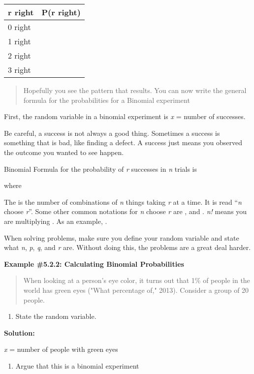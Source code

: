 \documentclass[]{book}
\providecommand{\tightlist}{%
  \setlength{\itemsep}{0pt}\setlength{\parskip}{0pt}}
\begin{document}
\begin{longtable}[]{@{}ll@{}}
\toprule
r right & P(r right)\tabularnewline
\midrule
\endhead
0 right &\tabularnewline
1 right &\tabularnewline
2 right &\tabularnewline
3 right &\tabularnewline
\bottomrule
\end{longtable}

\begin{quote}
Hopefully you see the pattern that results. You can now write the
general formula for the probabilities for a Binomial experiment
\end{quote}

First, the random variable in a binomial experiment is \emph{x} = number of
successes.

Be careful, a success is not always a good thing. Sometimes a success is
something that is bad, like finding a defect. A success just means you
observed the outcome you wanted to see happen.

Binomial Formula for the probability of \emph{r} successes in \emph{n} trials is

where

The is the number of combinations of \emph{n} things taking \emph{r} at a time. It
is read ``\emph{n} choose \emph{r}''. Some other common notations for \emph{n} choose \emph{r}
are , and . \emph{n!} means you are multiplying . As an example, .

When solving problems, make sure you define your random variable and
state what \emph{n}, \emph{p}, \emph{q}, and \emph{r} are. Without doing this, the problems
are a great deal harder.

\textbf{Example \#5.2.2: Calculating Binomial Probabilities}

\begin{quote}
When looking at a person's eye color, it turns out that 1\% of people
in the world has green eyes ("What percentage of," 2013). Consider a
group of 20 people.
\end{quote}

\begin{enumerate}
\def\labelenumi{\alph{enumi}.}
\tightlist
\item
  State the random variable.
\end{enumerate}

\textbf{Solution:}

\emph{x} = number of people with green eyes

\begin{enumerate}
\def\labelenumi{\alph{enumi}.}
\setcounter{enumi}{1}
\tightlist
\item
  Argue that this is a binomial experiment
\end{enumerate}
\end{document}
